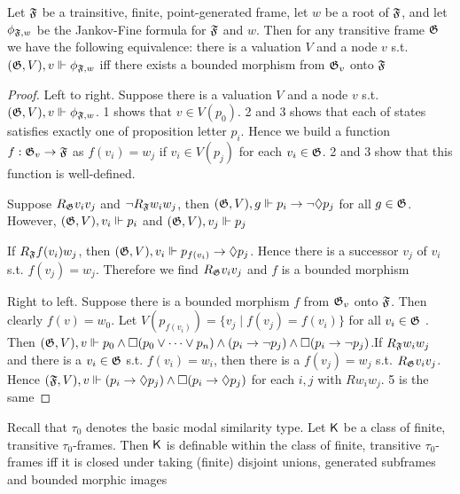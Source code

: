 \documentclass[11pt]{article}
\begin{document}
\begin{lemma}[]
Let \(\mathfrak{F}\) be a trainsitive, finite, point-generated frame, let \(w\) be a
root of \(\mathfrak{F}\), and let \(\phi_{\mathfrak{F},w}\) be the Jankov-Fine formula for
\(\mathfrak{F}\) and \(w\). Then for any transitive frame \(\mathfrak{G}\) we have the
following equivalence: there is a valuation \(V\) and a node \(v\) s.t.
\((\mathfrak{G},V),v\Vdash\phi_{\mathfrak{F},w}\) iff there exists a bounded morphism from
\(\mathfrak{G}_v\) onto \(\mathfrak{F}\)
\end{lemma}

\begin{proof}
Left to right. Suppose there is a valuation \(V\) and a node \(v\) s.t.
\((\mathfrak{G},V),v\Vdash\phi_{\mathfrak{F},w}\).  1 shows that \(v\in V(p_0)\). 2 and 3
shows that each of states satisfies exactly one of proposition letter
\(p_i\). Hence we build a function \(f:\mathfrak{G}_v\to\mathfrak{F}\) as \(f(v_i)=w_j\) if
\(v_i\in V(p_j)\) for each \(v_i\in\mathfrak{G}\). 2 and 3 show that this function is
well-defined.

Suppose \(R_{\mathfrak{G}}v_iv_j\) and \(\neg R_{\mathfrak{F}}w_iw_j\), then \((\mathfrak{G},V),g\Vdash
    p_i\to\neg\Diamond p_j\) for all \(g\in\mathfrak{G}\). However, \((\mathfrak{G},V),v_i\Vdash
    p_i\) and \((\mathfrak{G},V),v_j\Vdash p_j\)

If \(R_{\mathfrak{F}}f(v_i)w_j\), then \((\mathfrak{G},V),v_i\Vdash p_{f(v_i)}\to\Diamond
    p_j\). Hence there is a successor \(v_j\) of \(v_i\) s.t. \(f(v_j)=w_j\).
Therefore we find \(R_{\mathfrak{G}}v_iv_j\) and \(f\) is a bounded morphism

Right to left. Suppose there is a bounded morphism \(f\) from \(\mathfrak{G}_v\) onto
\(\mathfrak{F}\). Then clearly \(f(v)=w_0\). Let \(V(p_{f(v_i)})=\{v_j\mid f(v_j)=f(v_i)\}\) for all
\(v_i\in\mathfrak{G}\) . Then \((\mathfrak{G},V),v\Vdash p_0\wedge\Box(p_0\vee\dots\vee p_n)
    \wedge(p_i\to\neg p_j)\wedge\Box(p_i\to\neg p_j)\).If \(R_{\mathfrak{F}}w_iw_j\) and
there is a \(v_i\in\mathfrak{G}\) s.t. \(f(v_i)=w_i\), then there is a \(f(v_j)=w_j\)
s.t. \(R_{\mathfrak{G}}v_iv_j\). Hence \((\mathfrak{F},V),v\Vdash (p_i\to\Diamond
    p_j)\wedge\Box(p_i\to\Diamond p_j)\) for each \(i,j\) with \(Rw_iw_j\). 5 is
the same
\end{proof}

\begin{theorem}[]
Recall that \(\tau_0\) denotes the basic modal similarity type. Let \(\textsf{K}\)
be a class of finite, transitive \(\tau_0\)-frames. Then \(\textsf{K}\) is
definable within the class of finite, transitive \(\tau_0\)-frames iff it is
closed under taking (finite) disjoint unions, generated subframes and
bounded morphic images
\end{theorem}
\end{document}
